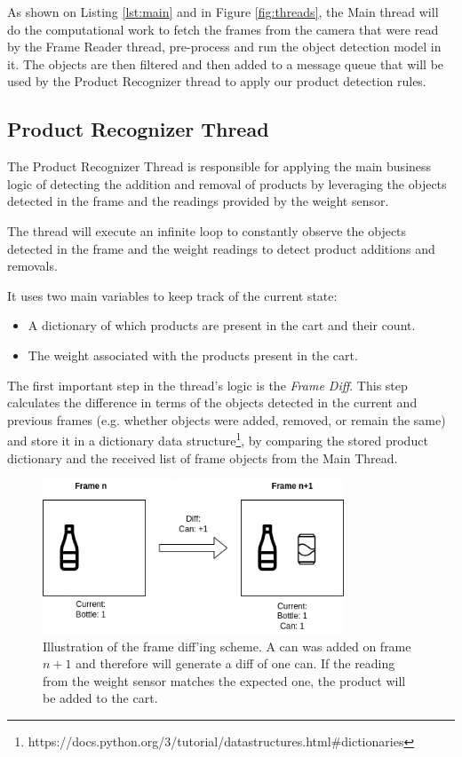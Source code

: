 \documentclass[openright]{normas-utf-tex} %
\begin{document}
As shown on Listing \ref{lst:main} and in Figure \ref{fig:threads}, the Main
thread will do the computational work to fetch the frames from the camera that
were read by the Frame Reader thread, pre-process and run the object detection
model in it. The objects are then filtered and then added to a message queue
that will be used by the Product Recognizer thread to apply our product
detection rules.

\subsection{Product Recognizer Thread}

The Product Recognizer Thread is responsible for applying the main business
logic of detecting the addition and removal of products by leveraging the
objects detected in the frame and the readings provided by the weight sensor.

The thread will execute an infinite loop to constantly observe the objects
detected in the frame and the weight readings to detect product additions
and removals.

It uses two main variables to keep track of the current state:
\begin{itemize}
    \item A dictionary of which products are present in the cart and their count.
    \item The weight associated with the products present in the cart.
\end{itemize}

The first important step in the thread's logic is the \textit{Frame Diff}. This step 
calculates the difference in terms of the objects detected in the current 
and previous frames (e.g. whether objects were added, removed, or remain the same) 
and store it in a dictionary data structure\footnote{https://docs.python.org/3/tutorial/datastructures.html\#dictionaries},
by comparing the stored product dictionary and the received list of frame
objects from the Main Thread.

\begin{figure}[H]
	\centering
	\includegraphics[width=0.8\textwidth]{./images/diagrams/framediff.png}
	\caption[Illustration of the frame diff'ing scheme]{Illustration of the frame diff'ing scheme. A can was added on frame $n+1$ and therefore will generate a diff of one can. If the reading from the weight sensor matches the expected one, the product will be added to the cart.}
    \label{fig:diff}
\end{figure}
\end{document}
